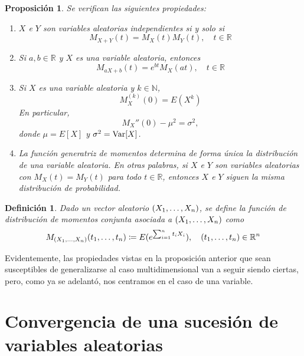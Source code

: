 \documentclass[11pt]{report}
\newtheorem{proposition}{Proposición}
\newtheorem{definition}{Definición}
\theoremstyle{definition}
\newcommand{\R}{\mathbb R}
\newcommand{\N}{\mathbb N}
\begin{document}
\begin{proposition}
Se verifican las siguientes propiedades:
\begin{enumerate}
    \item $X$ e $Y$ son variables aleatorias independientes si y solo si
    \[M_{X+Y}(t)=M_X(t)M_Y(t), \quad t \in \R\]
    \item Si $a,b\in \R$ y $X$ es una variable aleatoria, entonces
    \[M_{aX+b}(t) = e^{bt}M_X(at), \quad t \in \R\]
    \item Si $X$ es una variable aleatoria y $k \in \N$,
    \[M_X^{(k)}(0)=E(X^k)\]
    En particular, 
    \[M_X''(0) -\mu^2 = \sigma^2,\]
    donde $\mu = E[X]$ y $\sigma^2 = \textup{Var}[X]$.
    \item La función generatriz de momentos determina de forma única la distribución de una variable aleatoria. En otras palabras, si $X$ e $Y$ son variables aleatorias con $M_X(t) = M_Y(t)$ para todo $t \in \R$, entonces $X$ e $Y$ siguen la misma distribución de probabilidad.
\end{enumerate}
\end{proposition}

\begin{definition}
Dado un vector aleatorio $(X_1,\mathellipsis,X_n)$, se define la \emph{función de distribución de momentos conjunta asociada a $(X_1,\mathellipsis,X_n)$} como
\[M_{(X_1,\mathellipsis,X_n)}(t_1,\mathellipsis,t_n) \coloneqq E(e^{\sum_{i=1}^n t_iX_i}), \quad (t_1,\mathellipsis,t_n) \in \R^n\]
\end{definition}

Evidentemente, las propiedades vistas en la proposición anterior que sean susceptibles de generalizarse al caso multidimensional van a seguir siendo ciertas, pero, como ya se adelantó, nos centramos en el caso de una variable.

\section{Convergencia de una sucesión de variables aleatorias}
\end{document}
